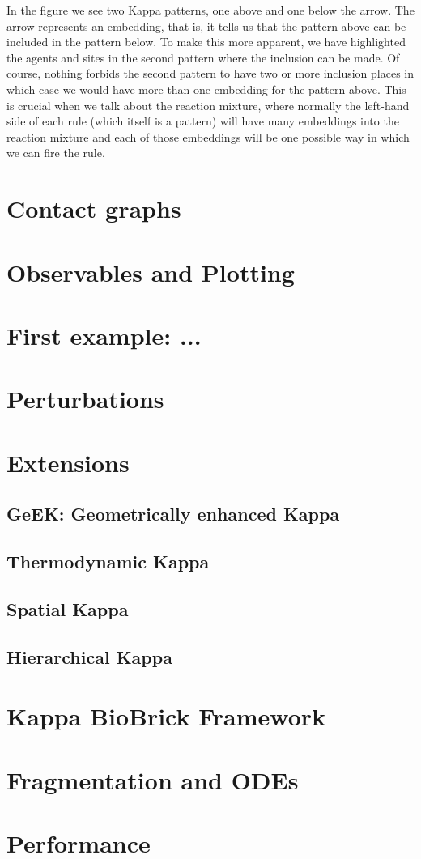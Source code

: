 \documentclass{article}
\newcommand{\kpp}{Kappa\xspace}
\begin{document}
In the figure we see two \kpp patterns, one above and one below the
arrow.  The arrow represents an embedding, that is, it tells us that
the pattern above can be included in the pattern below.  To make this
more apparent, we have highlighted the agents and sites in the second
pattern where the inclusion can be made.  Of course, nothing forbids
the second pattern to have two or more inclusion places in which case
we would have more than one embedding for the pattern above.  This is
crucial when we talk about the reaction mixture, where normally the
left-hand side of each rule (which itself is a pattern) will have many
embeddings into the reaction mixture and each of those embeddings will
be one possible way in which we can fire the rule.

\section{Contact graphs}

\section{Observables and Plotting}

\section{First example: ...}

\section{Perturbations} %

\section{Extensions}
\subsection{GeEK: Geometrically enhanced Kappa}

\subsection{Thermodynamic Kappa}

\subsection{Spatial Kappa}

\subsection{Hierarchical Kappa} %

\section{Kappa BioBrick Framework}

\section{Fragmentation and ODEs}

\section{Performance} %
\end{document}
